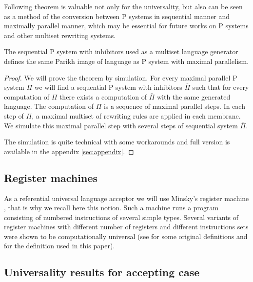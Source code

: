 \documentclass[llncs,submission,copyright,creativecommons]{../lib/lncs/llncs}
\begin{document}
Following theorem is valuable not only for the universality, but also can be seen as a method of the conversion between P systems in sequential manner and maximally parallel manner, which may be essential for future works on P systems and other multiset rewriting systems.

\begin{theorem}
\label{theorem:inhibitors_generative_universal}
  The sequential P system with inhibitors used as a multiset language generator defines the same Parikh image of language as P system with maximal parallelism.
\end{theorem}

\begin{proof}
  We will prove the theorem by simulation. For every maximal parallel P system $\Pi$ we will find a sequential P system with inhibitors $\overline{\Pi}$ such that for every computation of $\Pi$ there exists a computation of $\overline{\Pi}$ with the same generated language.
  The computation of $\Pi$ is a sequence of maximal parallel steps.
  In each step of $\Pi$, a maximal multiset of rewriting rules are applied in each membrane.
  We simulate this maximal parallel step with several steps of sequential system $\overline{\Pi}$.

  The simulation is quite technical with some workarounds and full version is available in the appendix \ref{sec:appendix}.
\end{proof}

\subsection{Register machines} %
\label{sub:register_machines}
  As a referential universal language acceptor we will use Minsky's register machine \cite{Ionescu:jucs_10_5:on_p_systems_with}, that is why we recall here this notion. Such a machine runs a program consisting of numbered instructions of several simple types. Several variants of register machines with different number of registers and different instructions sets were shown to be computationally universal (see \cite{Ibarra:2005:SPS:2111772.2111880} for some original definitions and \cite{Khrisna03threeuniversality} for the definition used in this paper).


  

\subsection{Universality results for accepting case} %
\label{sub:universality_results_for_accepting_case}
\end{document}
